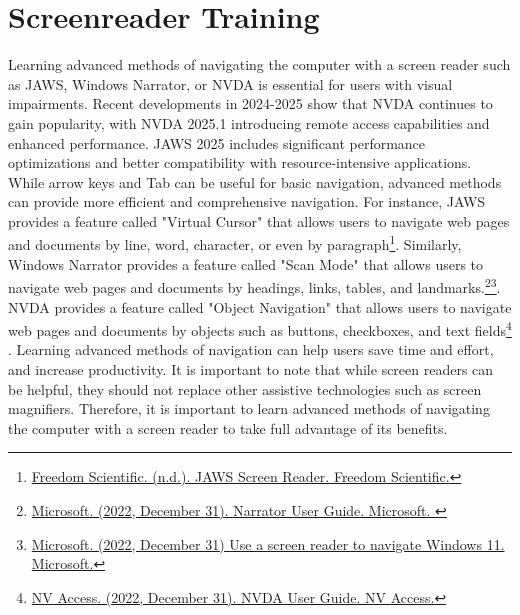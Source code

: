 \hypertarget{appx7}{}\section[Screenreader Training]{Screenreader Training}\label{appx7}
Learning advanced methods of navigating the computer with a screen reader such as JAWS, Windows Narrator, or NVDA is essential for users with visual impairments. Recent developments in 2024-2025 show that NVDA continues to gain popularity, with NVDA 2025.1 introducing remote access capabilities and enhanced performance. JAWS 2025 includes significant performance optimizations and better compatibility with resource-intensive applications. While arrow keys and Tab can be useful for basic navigation, advanced methods can provide more efficient and comprehensive navigation. For instance, JAWS provides a feature called "Virtual Cursor" that allows users to navigate web pages and documents by line, word, character, or even by paragraph\footnote{\raggedright \href{https://www.freedomscientific.com/products/software/jaws}{Freedom Scientific. (n.d.). JAWS Screen Reader. Freedom Scientific.}}. Similarly, Windows Narrator provides a feature called "Scan Mode" that allows users to navigate web pages and documents by headings, links, tables, and landmarks.\footnote{\raggedright \href{https://support.microsoft.com/en-us/windows/narrator-user-guide-4b2e6b3f-1d6d-8a5c-4f6d2a3b3d6f}{Microsoft. (2022, December 31). Narrator User Guide. Microsoft. }}\footnote{\raggedright \href{https://support.microsoft.com/en-us/windows/use-a-screen-reader-to-navigate-windows-11-5f8a9e7c-7d3e-2d5a-0f5c-5f9b5b8a7a3d}{Microsoft. (2022, December 31) Use a screen reader to navigate Windows 11. Microsoft.}}. NVDA provides a feature called "Object Navigation" that allows users to navigate web pages and documents by objects such as buttons, checkboxes, and text fields\footnote{\raggedright \href{https://www.nvaccess.org/files/nvda/documentation/userGuide.html\#toc3.1}{NV Access. (2022, December 31). NVDA User Guide. NV Access.}} . Learning advanced methods of navigation can help users save time and effort, and increase productivity. It is important to note that while screen readers can be helpful, they should not replace other assistive technologies such as screen magnifiers. Therefore, it is important to learn advanced methods of navigating the computer with a screen reader to take full advantage of its benefits.
